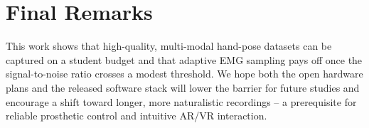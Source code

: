\section{Final Remarks}

This work shows that high-quality, multi-modal hand-pose datasets can be
captured on a student budget and that adaptive EMG sampling pays off once the
signal-to-noise ratio crosses a modest threshold.
We hope both the open hardware plans and the released software stack will lower
the barrier for future studies and encourage a shift toward longer, more
naturalistic recordings -- a prerequisite for reliable prosthetic control and
intuitive AR/VR interaction.